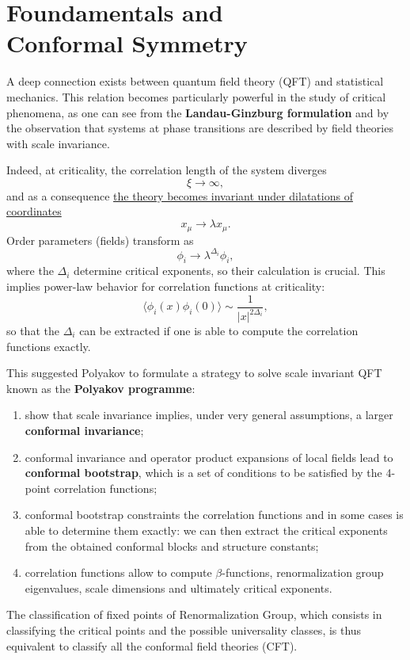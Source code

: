\chapter[Foundamentals and Conformal Symmetry]{Foundamentals and \\Conformal Symmetry}

A deep connection exists between quantum field theory (QFT) and statistical mechanics.
This relation becomes particularly powerful in the study of critical phenomena, as one can see from the \textbf{Landau-Ginzburg formulation} and by the observation that systems at phase transitions are described by field theories with scale invariance.

Indeed, at criticality, the correlation length of the system diverges
\[
    \xi \to \infty,
\]
and as a consequence \uline{the theory becomes invariant under dilatations of coordinates}
\[
    x_{\mu}\rightarrow\lambda x_{\mu}.
\]
Order parameters (fields) transform as
\[
    \phi_{i}\rightarrow\lambda^{\Delta_{i}}\phi_{i},
\]
where the \(\Delta_i\) determine critical exponents, so their calculation is crucial. This implies power-law behavior for correlation functions at criticality:
\[
    \langle\phi_{i}(x)\phi_{i}(0)\rangle\sim\frac{1}{|x|^{2\Delta_{i}}},
\]
so that the \(\Delta_{i}\) can be extracted if one is able to compute the correlation functions exactly.

This suggested Polyakov to formulate a strategy to solve scale invariant QFT known as the \textbf{Polyakov programme}:
\begin{enumerate}
    \item show that scale invariance implies, under very general assumptions, a larger \textbf{conformal invariance};
    \item conformal invariance and operator product expansions of local fields lead to \textbf{conformal bootstrap}, which is a set of conditions to be satisfied by the 4-point correlation functions;
    \item conformal bootstrap constraints the correlation functions and in some cases is able to determine them exactly: we can then extract the critical exponents from the obtained conformal blocks and structure constants;
    \item correlation functions allow to compute \(\beta\)-functions, renormalization group eigenvalues, scale dimensions and ultimately critical exponents.
\end{enumerate}
The classification of fixed points of Renormalization Group, which consists in classifying the critical points and the possible universality classes, is thus equivalent to classify all the conformal field theories (CFT).

